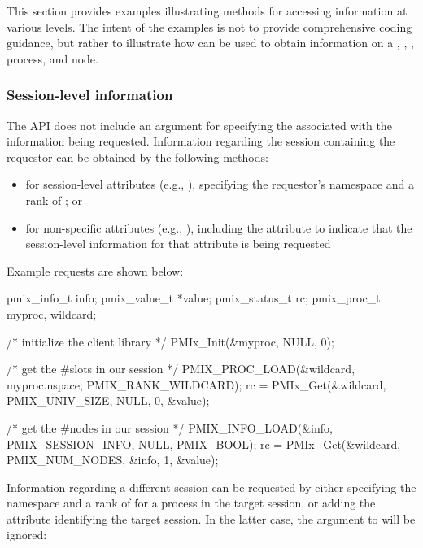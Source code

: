 This section provides examples illustrating methods for accessing information at various levels. The intent of the examples is not to provide comprehensive coding guidance, but rather to illustrate how  can be used to obtain information on a , , , process, and node.

\subsubsection{Session-level information}

The  \ac{API} does not include an argument for specifying the  associated with the information being requested. Information regarding the session containing the requestor can be obtained by the following methods:

\begin{itemize}
\item for session-level attributes (e.g., ), specifying the requestor's namespace and a rank of ; or
\item for non-specific attributes (e.g., ), including the  attribute to indicate that the session-level information for that attribute is being requested
\end{itemize}

Example requests are shown below:

\cspecificstart
\begin{codepar}
pmix_info_t info;
pmix_value_t *value;
pmix_status_t rc;
pmix_proc_t myproc, wildcard;

/* initialize the client library */
PMIx_Init(&myproc, NULL, 0);

/* get the #slots in our session */
PMIX_PROC_LOAD(&wildcard, myproc.nspace, PMIX_RANK_WILDCARD);
rc = PMIx_Get(&wildcard, PMIX_UNIV_SIZE, NULL, 0, &value);

/* get the #nodes in our session */
PMIX_INFO_LOAD(&info, PMIX_SESSION_INFO, NULL, PMIX_BOOL);
rc = PMIx_Get(&wildcard, PMIX_NUM_NODES, &info, 1, &value);
\end{codepar}
\cspecificend

Information regarding a different session can be requested by either specifying the namespace and a rank of  for a process in the target session, or adding the  attribute identifying the target session. In the latter case, the  argument to  will be ignored:

